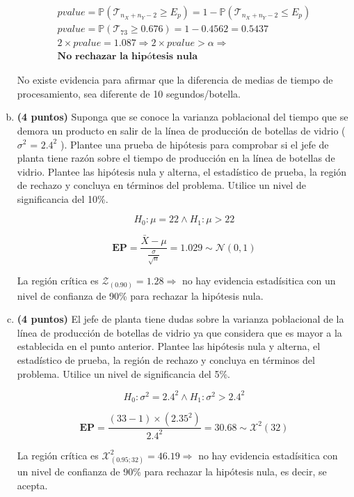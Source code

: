 \documentclass[../main.tex]{subfiles}
\begin{document}
\begin{enumerate}[(a)]
\begin{equation}
\begin{split}
pvalue = \mathbb{P}(\mathcal{T}_{n_X+n_Y - 2} \geq E_p ) = 1 - \mathbb{P}(\mathcal{T}_{n_X+n_Y - 2} \leq E_p ) \\
pvalue = \mathbb{P}(\mathcal{T}_{73} \geq 0.676 ) = 1 - 0.4562 = 0.5437 \\
2 \times pvalue = 1.087 \Rightarrow 2 \times pvalue > \alpha \Rightarrow	\\
\textbf{No rechazar la hipótesis nula}
\end{split}
\end{equation}

No existe evidencia para afirmar que la diferencia de medias de tiempo de procesamiento, sea diferente de 10 segundos/botella.

\item \textbf{(4 puntos)} Suponga que se conoce la varianza poblacional del tiempo que se demora un producto en salir de la línea de producción de botellas de vidrio ($\sigma ^2$ = $2.4^2$ ). Plantee una prueba de hipótesis para comprobar si el jefe de planta tiene razón sobre el tiempo de producción en la línea de botellas de vidrio. Plantee las hipótesis nula y alterna, el estadístico de prueba, la región de rechazo y concluya en términos del problema. Utilice un nivel de significancia del 10\%.

$$H_0 : \mu = 22 \wedge H_1 : \mu > 22$$

 $$\textbf{EP} = \frac{\bar{X} -\mu}{\frac{\sigma}{\sqrt{n}}} = 1.029 \sim \mathcal{N}(0, 1)$$
 
 La región crítica es $\mathcal{Z}_{(0.90)} = 1.28 \Rightarrow$ no hay evidencia estadísitica con un nivel de confianza de 90\% para rechazar la hipótesis nula.

\item \textbf{(4 puntos)}  El jefe de planta tiene dudas sobre la varianza poblacional de la línea de producción de botellas de vidrio ya que considera que es mayor a la establecida en el punto
anterior. Plantee las hipótesis nula y alterna, el estadístico de prueba, la región de rechazo
y concluya en términos del problema. Utilice un nivel de significancia del 5\%.

$$H_0 : \sigma ^2 = 2.4^2 \wedge H_1 : \sigma ^2 > 2.4 ^2$$

 $$\textbf{EP} = \frac{(33 - 1) \times (2.35^2)}{2.4^2} = 30.68 \sim \mathcal{X}^2(32)$$
 
 La región crítica es $\mathcal{X}^2_{(0.95; 32)} = 46.19 \Rightarrow$ no hay evidencia estadísitica con un nivel de confianza de 90\% para rechazar la hipótesis nula, es decir, se acepta.


\end{enumerate}
\end{document}
